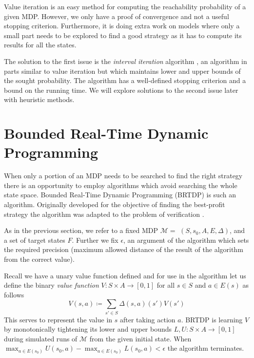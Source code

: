 Value iteration is an easy method for computing the reachability
probability of a given MDP.  However, we only have a proof of convergence
and not a useful stopping criterion.  Furthermore, it is doing extra work
on models where only a small part needs to be explored to find a good
strategy as it has to compute its results for all the states.

The solution to the first issue is the {\em interval iteration}
algorithm \parencite{interval_iteration}, an algorithm in parts similar
to value iteration but which maintains lower and upper bounds of the
sought probability. The algorithm has a well-defined stopping criterion
and a bound on the running time.  We will explore solutions to the
second issue later with heuristic methods.


\section{Bounded Real-Time Dynamic Programming}
\label{sec:brtdp}

When only a portion of an MDP needs to be searched to find the right
strategy there is an opportunity to employ algorithms which avoid
searching the whole state space. Bounded Real-Time Dynamic Programming
(BRTDP) is such an algorithm. Originally developed for
the objective of finding the best-profit strategy
\parencite{profit_brtdp} the algorithm was adapted to the problem of
verification \parencite{atva14}.

As in the previous section, we refer to a fixed MDP $\mathcal{M} =$
\linebreak $(S,s_0,A,E,\Delta)$, and a set of target states
$F$. Further we fix $\epsilon$, an argument of the algorithm which sets
the required precision (maximum allowed distance of the result of the
algorithm from the correct value).

Recall we have a unary value function defined
and for use in the algorithm let us define the binary {\em value function}
$V : S \times A \to [0,1]$ for all $s \in S$ and $a \in E(s)$ as follows
\[
    V(s,a) \coloneqq \sum_{s' \in S} \Delta(s,a)(s')V(s')
\]
This serves to represent the value in $s$ after taking action $a$.
BRTDP is learning $V$ by monotonically tightening its lower and upper
bounds $L, U : S \times A \to [0,1]$ during simulated runs of
$\mathcal{M}$ from the given initial state.
When $\max_{a \in E(s_0)} U(s_0, a) - \max_{a \in E(s_0)} L(s_0, a) < \epsilon$
the algorithm terminates.

